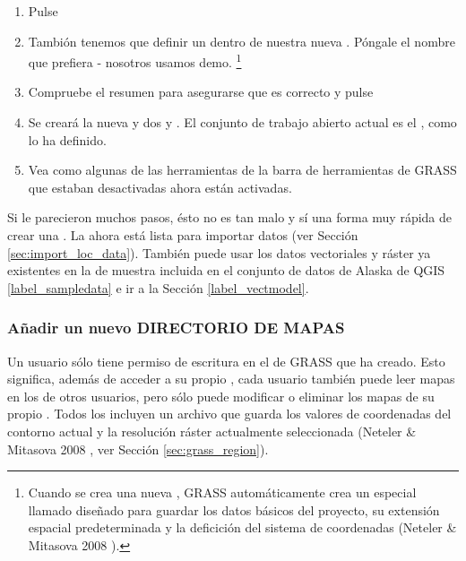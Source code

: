 \begin{enumerate}
  \item Pulse  
  \item Tambión tenemos que definir un  dentro de nuestra nueva 
  . Póngale el nombre que prefiera - nosotros usamos demo.
  \footnote{Cuando se crea una nueva , GRASS automáticamente 
  crea un  especial llamado  diseñado para 
  guardar los datos básicos del proyecto, su extensión espacial predeterminada y 
  la deficición del sistema de coordenadas (Neteler \& Mitasova 2008 
  \cite{neteler_mitasova08}).}
  \item Compruebe el resumen para asegurarse que es correcto y pulse
  \item Se creará la nueva  y dos 
  y . El conjunto de trabajo abierto actual es el
  , como lo ha definido.
  \item Vea como algunas de las herramientas de la barra de herramientas de GRASS que estaban desactivadas ahora están activadas.
\end{enumerate}

Si le parecieron muchos pasos, ésto no es tan malo y sí una forma muy rápida de crear una . La  ahora está lista para importar datos (ver Sección \ref{sec:import_loc_data}).
También puede usar los datos vectoriales y ráster ya existentes en la  de muestra incluida en el conjunto de datos de Alaska de QGIS 
\ref{label_sampledata} e ir a la Sección \ref{label_vectmodel}.

\subsubsection{Añadir un nuevo DIRECTORIO DE MAPAS}\label{sec:add_mapset}

Un usuario sólo tiene permiso de escritura en el  de GRASS que ha creado. Esto 
significa, además de acceder a su propio , cada usuario también puede leer mapas en los 
 de otros usuarios, pero sólo puede modificar o eliminar los mapas de su propio 
. Todos los  incluyen un archivo 
 que guarda los valores de coordenadas del contorno actual y 
la resolución ráster actualmente seleccionada (Neteler \& Mitasova 2008 
\cite{neteler_mitasova08}, ver Sección \ref{sec:grass_region}). 

